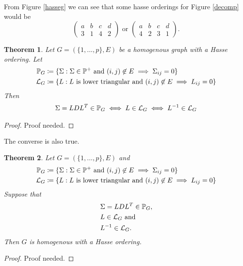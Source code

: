 \documentclass[12pt, leqno]{article}
\def\s{\ensuremath\Sigma}
\def\pd{\ensuremath\mathbb{P}^+}
\def\pg{\ensuremath\mathbb{P}_{{G}}}
\newtheorem{thm}{Theorem}[]
\begin{document}
From Figure \ref{hasseg} we can see that some hasse orderings for Figure
\ref{decomp} would be 
\[
\begin{pmatrix} 
a & b & c & d \\
3&1&4&2 
\end{pmatrix} 
\text { or }
\begin{pmatrix} 
a & b & c & d \\
4&2&3&1 
\end{pmatrix}.
\]
\begin{thm}
Let $G = (\{1,...,p\},E)$ be a homogenous graph with a Hasse
ordering. Let 
\begin{align*}
\pg &\coloneqq \{\s:\s \in \pd \text{ and } (i,j)\not\in E \implies \s_{ij} =
      0\}\\
\mathcal{L}_G &\coloneqq \{L:L \text{ is lower triangular and } (i,j)\not\in E \implies L_{ij} =
      0\}
\end{align*}
Then
\begin{align*}
\s = LDL^T \in \pg \iff L \in \mathcal{L}_G \iff L^{-1} \in \mathcal{L}_G
\end{align*}
\end{thm}
\begin{proof}
Proof needed.
\end{proof}
The converse is also true.
\begin{thm}
Let $G = (\{1,...,p\},E)$ and 
\begin{align*}
\pg &\coloneqq \{\s:\s \in \pd \text{ and } (i,j)\not\in E \implies \s_{ij} =
      0\}\\
\mathcal{L}_G &\coloneqq \{L:L \text{ is lower triangular and } (i,j)\not\in E \implies L_{ij} =
      0\}
\end{align*}
Suppose that 
\begin{align*}
&\s = LDL^T \in \pg, \\ 
&L \in \mathcal{L}_G \text{ and }\\
&L^{-1} \in \mathcal{L}_G.
\end{align*}
Then $G$ is homogenous with a Hasse ordering. 
\end{thm}
\begin{proof}
Proof needed.
\end{proof}
\end{document}
